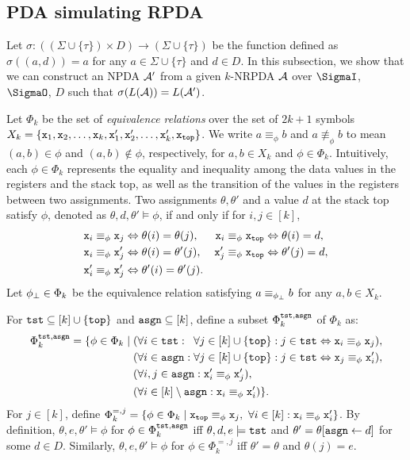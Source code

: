 \subsection{PDA simulating RPDA}

Let $\sigma:((\Sigma\cup\{\tau\})\times D)\to(\Sigma\cup\{\tau\})$
be the function
defined as $\sigma((a,d))=a$
for any $a\in\Sigma\cup\{\tau\}$ and $d\in D$.
In this subsection, we show that we can construct an NPDA ${\cal A}'$
from a given $k$-NRPDA ${\cal A}$ over $\SigmaI$, $\SigmaO$, $D$
such that $\sigma(L({\cal A}))=L({\cal A}')$.

Let $\Phi_k$ be the set of
\emph{equivalence relations}
over the set of $2k+1$ symbols
$X_k=\{
 {\tt x}_1,{\tt x}_2,\ldots,{\tt x}_k,
 {\tt x}'_1,{\tt x}'_2,\ldots,{\tt x}'_k,
 {\tt x}_{\mathtt{top}} \}$.
 We write $a\equiv_{\phi}b$ and $a\not\equiv_{\phi}b$ to mean
 $(a,b)\in\phi$ and $(a,b)\notin\phi$, respectively,
for $a,b\in X_k$ and $\phi\in\Phi_k$.
%
Intuitively,
each $\phi\in\Phi_k$ represents the equality and inequality
among the data values in the registers and the stack top,
as well as the transition of the values in the registers
between two assignments.
Two assignments $\theta,\theta'$ and a value $d$ at the stack top
satisfy $\phi$,
denoted as $\theta,d,\theta'\models\phi$,
if and only if for $i,j\in[k]$,
\begin{align*}
  {\tt x}_i\equiv_{\phi}{\tt x}_j &\Leftrightarrow \theta(i)=\theta(j),
  & {\tt x}_i\equiv_{\phi}{\tt x}_{\mathtt{top}} &\Leftrightarrow \theta(i)=d, \\
  {\tt x}_i\equiv_{\phi}{\tt x}'_j &\Leftrightarrow \theta(i)=\theta'(j),
  & {\tt x}'_j\equiv_{\phi}{\tt x}_{\mathtt{top}} &\Leftrightarrow \theta'(j)=d , \\
  {\tt x}'_i\equiv_{\phi}{\tt x}'_j &\Leftrightarrow \theta'(i)=\theta'(j).
\end{align*}
%
Let $\phi_{\bot}\in\Phi_k$ be the equivalence relation
satisfying $a\equiv_{\phi_{\bot}}b$ for any $a,b\in X_k$.

For $\mathtt{tst}\subseteq [k]\cup\{\mathtt{top}\}$ and $\mathtt{asgn}\subseteq [k]$,
define a subset $\Phi_k^{\mathtt{tst},\mathtt{asgn}}$ of $\Phi_k$ as:
\[
  \Phi_k^{\tst,\asgn} = \{ \phi\in\Phi_k \mid
    \begin{aligned}[t]
      & (\forall i\in\rlap{$\tst :{}$}\hphantom{\asgn:{}}
      \forall j\in [k]\cup\{\top\} :
      j\in\tst \Leftrightarrow \L_i \equiv_{\phi} \L_j), \\
      & (\forall i\in\asgn : \forall j\in [k]\cup\{\top\} :
      j\in\tst \Leftrightarrow \L_j \equiv_{\phi} \R_i), \\
      & (\forall i,j\in\asgn :
      \R_i \equiv_{\phi} \R_j), \\
      & (\forall i\in [k]\setminus\asgn :
      \L_i \equiv_{\phi} \R_i)\}.
    \end{aligned}
\]
For $j\in[k]$, define
$
  \Phi_k^{=,j} = \{ \phi\in\Phi_k \mid
    {\tt x}_{\mathtt{top}} \equiv_{\phi} {\tt x}_j, \
    \forall i\in[k] : {\tt x}_i \equiv_{\phi} {\tt x}'_i \}
$.
By definition,
$\theta,e,\theta'\models\phi$ for
$\phi\in\Phi_k^{\mathtt{tst},\mathtt{asgn}}$
iff
$\theta,d,e\models\mathtt{tst}$ and
$\theta'=\theta[\mathtt{asgn}\gets d]$ for some $d\in D$.
Similarly,
$\theta,e,\theta'\models\phi$ for
$\phi\in\Phi_k^{=,j}$
iff
$\theta'=\theta$ and $\theta(j)=e$.

